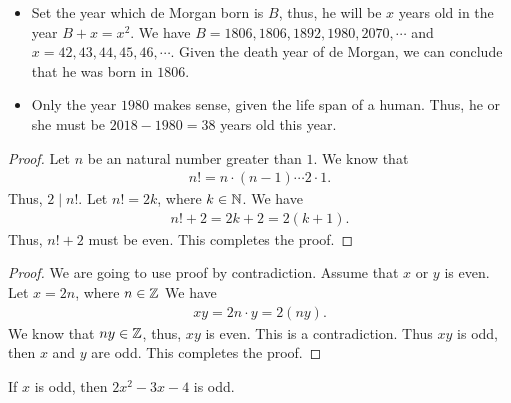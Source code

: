 \documentclass[8pt]{article}
\begin{document}
\begin{Answer}[number=2.2.4]
  \begin{itemize}
    \item Set the year which de Morgan born is $B$, thus, he will be $x$ years
      old in the year $B+x = x^2$. We have $B=1806, 1806, 1892, 1980, 2070,\cdots$ and
      $x=42,43,44,45,46,\cdots$. Given the death year of de Morgan, we can conclude that
      he was born in $1806$.
    \item Only the year $1980$ makes sense, given the life span of a human.
      Thus, he or she must be $2018-1980=38$ years old this year.
  \end{itemize}
\end{Answer}

\begin{Answer}[number=2.2.5]
  \begin{proof}
    Let $n$ be an natural number greater than $1$. We know that
    \begin{align*}
      n! = n\cdot (n-1) \cdots 2 \cdot 1.
    \end{align*}
    Thus, $2\mid n!$. Let $n! = 2k$, where $k\in \mathbb{N}$. We have
    \begin{align*}
      n! + 2 = 2k+2 = 2(k+1).
    \end{align*}
    Thus, $n!+2$ must be even. This completes the proof.
  \end{proof}
\end{Answer}

\begin{Answer}[number=2.2.6]
  \begin{proof}
    We are going to use proof by contradiction. Assume that $x$ or $y$ is even.
    Let $x = 2n$, where $n\in \mathbb{Z}$
    We have
    \begin{align*}
      xy = 2n \cdot y = 2(ny).
    \end{align*}
    We know that $ny\in \mathbb{Z}$, thus, $xy$ is even. This is a contradiction. Thus
    $xy$ is odd, then $x$ and $y$ are odd. This completes the proof.
  \end{proof}
\end{Answer}

\begin{Answer}[number=2.2.8]
  If $x$ is odd, then $2x^2 - 3x - 4$ is odd.
\end{Answer}
\end{document}
